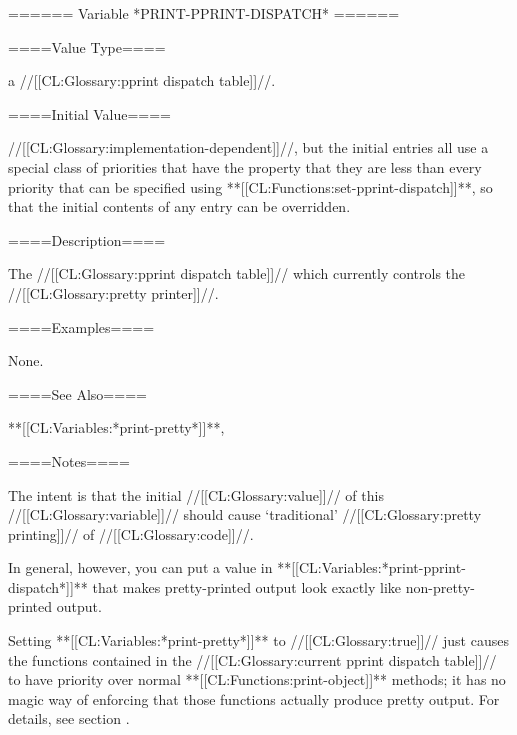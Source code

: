 ====== Variable *PRINT-PPRINT-DISPATCH* ======

====Value Type====

a //[[CL:Glossary:pprint dispatch table]]//.

====Initial Value====

//[[CL:Glossary:implementation-dependent]]//, but the initial entries all use a special class of priorities that have the property that they are less than every priority that can be specified using **[[CL:Functions:set-pprint-dispatch]]**, so that the initial contents of any entry can be overridden.

====Description====

The //[[CL:Glossary:pprint dispatch table]]// which currently controls the //[[CL:Glossary:pretty printer]]//.

====Examples====

None.

====See Also====

**[[CL:Variables:*print-pretty*]]**, {\secref\PPrintDispatchTables}

====Notes====

The intent is that the initial //[[CL:Glossary:value]]// of this //[[CL:Glossary:variable]]// should cause `traditional' //[[CL:Glossary:pretty printing]]// of //[[CL:Glossary:code]]//.

In general, however, you can put a value in **[[CL:Variables:*print-pprint-dispatch*]]** that makes pretty-printed output look exactly like non-pretty-printed output.

Setting **[[CL:Variables:*print-pretty*]]** to //[[CL:Glossary:true]]// just causes the functions contained in the //[[CL:Glossary:current pprint dispatch table]]// to have priority over normal **[[CL:Functions:print-object]]** methods; it has no magic way of enforcing that those functions actually produce pretty output. For details, see section {\secref\PPrintDispatchTables}.

 
